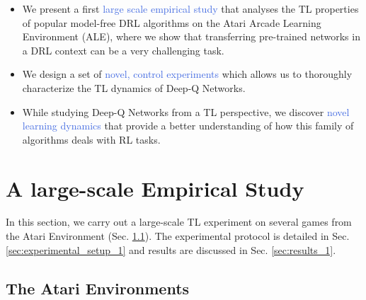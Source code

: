 \begin{itemize}
	\item We present a first \textcolor{RoyalBlue}{large scale empirical study} that analyses the TL properties of popular model-free DRL algorithms on the Atari Arcade Learning Environment (ALE), where we show that transferring pre-trained networks in a DRL context can be a very challenging task.
	\item We design a set of \textcolor{RoyalBlue}{novel, control experiments} which allows us to thoroughly characterize the TL dynamics of Deep-Q Networks.
	\item While studying Deep-Q Networks from a TL perspective, we discover \textcolor{RoyalBlue}{novel learning dynamics} that provide a better understanding of how this family of algorithms deals with RL tasks.  
\end{itemize}


\section{A large-scale Empirical Study}
\label{sec:empirical_study}

In this section, we carry out a large-scale TL experiment on several games from the Atari Environment (Sec. \ref{sec:atari_environments}). The experimental protocol is detailed in Sec. \ref{sec:experimental_setup_1} and results are discussed in Sec. \ref{sec:results_1}.

\subsection{The Atari Environments}
\label{sec:atari_environments}

